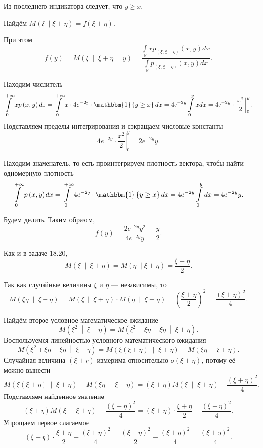 Из последнего индикатора следует, что $y \geq x$.

Найдём $M \left( \xi \; \middle| \xi + \eta \right) = f \left( \xi + \eta \right) $.

При этом
$$f \left( y \right) =
  M \left( \xi \; \middle| \; \xi + \eta = y \right) =
  \frac{ \int \limits_{ \mathbb{R}} xp_{ \left( \xi, \xi + \eta \right) } \left( x, y \right) dx}{ \int \limits_{ \mathbb{R}} p_{ \left( \xi, \xi + \eta \right) } \left( x, y \right) dx}.$$

Находим числитель
$$ \int \limits_0^{+ \infty } xp \left( x, y \right) dx =
  \int \limits_0^{+ \infty } x \cdot 4e^{-2y} \cdot \mathbbm{1} \left\{ y \geq x \right\} dx =
  4e^{-2y} \int \limits_0^y xdx =
  4e^{-2y} \cdot \left. \frac{x^2}{2} \right|_0^y.$$
Подставляем пределы интегрирования и сокращаем числовые константы
$$4e^{-2y} \cdot \left. \frac{x^2}{2} \right|_0^y =
  2e^{-2y} y.$$

Находим знаменатель, то есть проинтегрируем плотность вектора, чтобы найти одномерную плотность
$$ \int \limits_0^{+ \infty } p \left( x, y \right) dx =
  \int \limits_0^{+ \infty } 4e^{-2y} \cdot \mathbbm{1} \left\{ y \geq x \right\} dx =
  4e^{-2y} \int \limits_0^y dx =
  4e^{-2y} y.$$

Будем делить.
Таким образом,
$$f \left( y \right) =
  \frac{2e^{-2y} y^2}{4e^{-2y} y} =
  \frac{y}{2}.$$

Как и в задаче 18.20,
$$M \left( \xi \; \middle| \; \xi + \eta \right) =
  M \left( \eta \; \middle| \xi + \eta \right) =
  \frac{ \xi + \eta }{2}.$$

Так как случайные величины $ \xi $ и $ \eta $ --- независимы, то
$$M \left( \xi \eta \; \middle| \; \xi + \eta \right) =
  M \left( \xi \; \middle| \; \xi + \eta \right) \cdot
  M \left( \eta \; \middle| \; \xi + \eta \right) =
  \left( \frac{ \xi + \eta }{2} \right)^2 =
  \frac{ \left( \xi + \eta \right)^2}{4}.$$

Найдём второе условное математическое ожидание
$$M \left( \xi^2 \; \middle| \; \xi + \eta \right) =
  M \left( \xi^2 + \xi \eta - \xi \eta \; \middle| \; \xi + \eta \right).$$
Воспользуемся линейностью условного математического ожидания
$$M \left( \xi^2 + \xi \eta - \xi \eta \; \middle| \; \xi + \eta \right) =
  M \left( \xi \left( \xi + \eta \right) \; \middle| \; \xi + \eta \right) -
  M \left( \xi \eta \; \middle| \; \xi + \eta \right).$$
Случайная величина $ \left( \xi + \eta \right) $ измерима относительно
$ \sigma \left( \xi + \eta \right) $, потому её можно вынести
$$ M \left( \xi \left( \xi + \eta \right) \; \middle| \; \xi + \eta \right) -
  M \left( \xi \eta \; \middle| \; \xi + \eta \right) =
  \left( \xi + \eta \right) M \left( \xi \; \middle| \; \xi + \eta \right) -
  \frac{ \left( \xi + \eta \right)^2}{4}.$$
Подставляем найденное значение
$$ \left( \xi + \eta \right) M \left( \xi \; \middle| \; \xi + \eta \right) -
  \frac{ \left( \xi + \eta \right)^2}{4} =
  \left( \xi + \eta \right) \cdot \frac{ \xi + \eta }{2} - \frac{ \left( \xi + \eta \right)^2}{4}.$$
Упрощаем первое слагаемое
$$ \left( \xi + \eta \right) \cdot \frac{ \xi + \eta }{2} - \frac{ \left( \xi + \eta \right)^2}{4} =
  \frac{ \left( \xi + \eta \right)^2}{2} - \frac{ \left( \xi + \eta \right)^2}{4} =
  \frac{ \left( \xi + \eta \right)^2}{4}.$$
